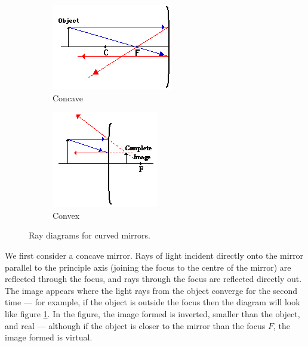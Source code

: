 \documentclass[a4paper]{amsbook}
\newcommand\capcite[1]{}
\begin{document}
\begin{figure}
  \centering
  \begin{subfigure}[t]{0.5\textwidth}
    \centering
    \includegraphics[width=.8\linewidth]{concave}
    \caption{Concave\\ \capcite{http://www.physicsclassroom.com/Class/refln/u13l3d2.gif}\label{fig:concave}}
  \end{subfigure}%
  \begin{subfigure}[t]{0.5\textwidth}
    \centering
    \includegraphics[width=.8\linewidth]{convex}
    \caption{Convex\\ \capcite{http://www.physicsclassroom.com/Class/refln/u13l4b4.gif}\label{fig:convex}}
  \end{subfigure}
  \caption{Ray diagrams for curved mirrors.}
\end{figure}

We first consider a concave mirror. Rays of light incident directly onto the mirror parallel to the principle axis (joining the focus
to the centre of the mirror) are reflected through the focus, and rays through the focus are reflected directly out. The image appears
where the light rays from the object converge for the second time --- for example, if the object is outside the focus then the diagram
will look like figure \ref{fig:concave}. In the figure, the image formed is inverted, smaller than the object, and real --- although if
the object is closer to the mirror than the focus $ F $, the image formed is virtual.
\end{document}
